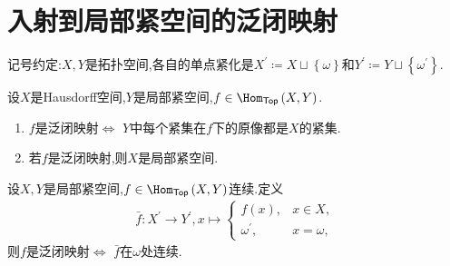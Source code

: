 \section{入射到局部紧空间的泛闭映射}

记号约定:$X,Y$是拓扑空间,各自的单点紧化是$X^{\prime}\coloneq X\sqcup\left\{\omega\right\}$和$Y^{\prime}\coloneq Y\sqcup\left\{\omega^{\prime}\right\}$.

\begin{proposition}{}{}
	设$X$是Hausdorff空间,$Y$是局部紧空间,$f\in\Hom_{\mathsf{Top}}\left(X,Y\right)$.
		\begin{enumerate}
			\item $f$是泛闭映射$\iff$ $Y$中每个紧集在$f$下的原像都是$X$的紧集.
			\item 若$f$是泛闭映射,则$X$是局部紧空间.
		\end{enumerate}
\end{proposition}

\begin{corollary}{}{}
	设$X,Y$是局部紧空间,$f\in\Hom_{\mathsf{Top}}\left(X,Y\right)$连续.定义
	\begin{align*}
		\bar{f}:X^{\prime}\to Y^{\prime},x\mapsto
		\begin{cases}
			f\left(x\right),&x\in X,\\
			\omega^{\prime},&x=\omega,
		\end{cases}
	\end{align*}
	则$f$是泛闭映射$\iff$ $\bar{f}$在$\omega$处连续.
\end{corollary}